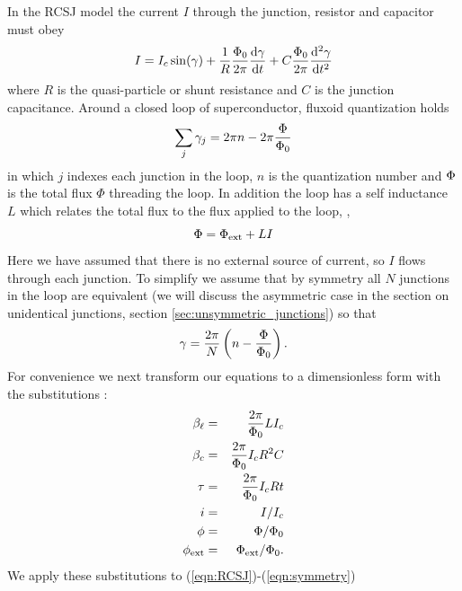 In the RCSJ model the current $I$ through the junction, resistor and
capacitor must obey
%
%
\begin{equation}
\label{eqn:RCSJ}
I = I_c \sin(\gamma) + {1\over R} {\Phi_0 \over 2 \pi}{\mathrm{d}\gamma \over \mathrm{d} t}
+ C {\Phi_0 \over 2 \pi} {\mathrm{d}^2\gamma \over \mathrm{d} t^2}
\end{equation}
%
where $R$ is the 
quasi-particle or shunt resistance and $C$ is the junction capacitance.  
Around a closed loop of superconductor,
fluxoid quantization holds
%
%
\begin{equation}
\label{eqn:fluxoidquant}
\sum_j \gamma_j = 2 \pi n - 2 \pi {\ensuremath{\Phi}\over \ensuremath{\Phi_0}}
\end{equation}
%
in which $j$ indexes each junction in the loop, $n$ is the quantization
number and $\Phi$ is the total flux $\Phi$ threading the loop.
In addition the loop has a self inductance $L$ which relates
the total flux to the flux applied to the loop, \Phiext,
%
%
%
\begin{equation}
\label{eqn:ftotvsfext}
\Phi = \Phi_{\mathrm{ext}} + L I 
\end{equation} 
%
Here we have assumed that there is no external source of current,
so $I$ flows through each junction.
To simplify we assume that by symmetry 
all $N$ junctions in the loop are equivalent (we will discuss the asymmetric
case in the section on unidentical junctions, 
section \ref{sec:unsymmetric_junctions}) so 
that
%
%
%
\begin{equation}
\label{eqn:symmetry}
\gamma = {2 \pi\over N} \left(n -  {\Phi \over \Phi_0}\right)
\mathrm{.}
\end{equation}
%
For convenience we next transform our equations to a dimensionless
form with the substitutions \cite{cawthorne_prb_60_7575_1999}:
% 
\begin{eqnarray}
\beta_\ell & = & {2 \pi \over \Phi_0} L I_c     \nonumber   \\
\beta_c & = & {2 \pi \over \Phi_0} I_c R^2 C  \nonumber  \\
\tau    & = & {2 \pi \over \Phi_0} I_c R t   \nonumber   \\
i       & = & I / I_c                       \nonumber \\
\phi & = & \Phi / \Phi_0             \nonumber \\
\phi_{\mathrm{ext}} & = & \Phi_{\mathrm{ext}} / \Phi_0 \mathrm{.}
\label{eqn:dimensionless_subs}
\end{eqnarray}
%
We apply these substitutions to (\ref{eqn:RCSJ})-(\ref{eqn:symmetry})
